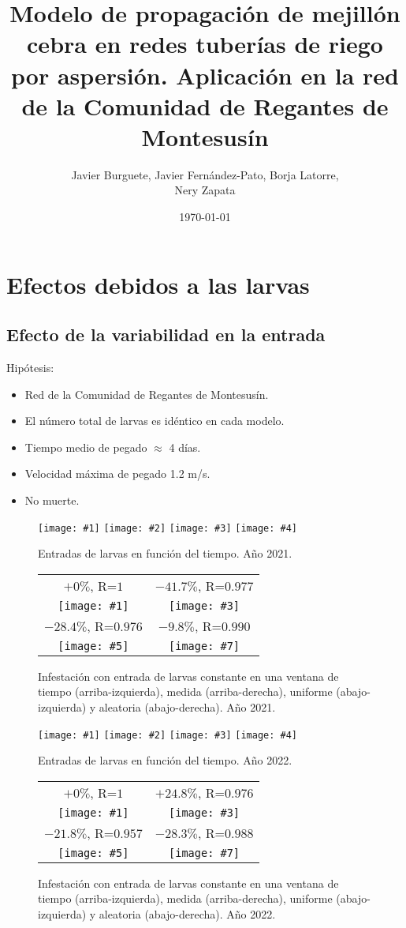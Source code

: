 \documentclass[a4paper]{article}
\author{Javier Burguete, Javier Fernández-Pato, Borja Latorre,\\ Nery Zapata}
\date{\today}
\title{Modelo de propagación de mejillón cebra en redes tuberías de riego por
aspersión. Aplicación en la red de la Comunidad de Regantes de Montesusín}
\newcommand{\FIGIV}[6]
{
	\begin{figure}[ht!]
		\centering
		\texttt{[image: \#1]}
		\texttt{[image: \#2]}
		\texttt{[image: \#3]}
		\texttt{[image: \#4]}
		\caption{#5.\label{#6}}
	\end{figure}
}
\newcommand{\FIGIVB}[9]
{
	\begin{figure}[ht!]
		\centering
		\begin{tabular}{cc}
			#2&#4\\
			\texttt{[image: \#1]}&
			\texttt{[image: \#3]}\\
			#6&#8\\
			\texttt{[image: \#5]}&
			\texttt{[image: \#7]}
		\end{tabular}
		\caption{#9.}
	\end{figure}
}
\begin{document}
\maketitle

\section{Efectos debidos a las larvas}

\subsection{Efecto de la variabilidad en la entrada}

Hipótesis:
\begin{itemize}
\item Red de la Comunidad de Regantes de Montesusín.
\item El número total de larvas es idéntico en cada modelo.
\item Tiempo medio de pegado $\approx$ 4 días.
\item Velocidad máxima de pegado 1.2 m/s.
\item No muerte.
\end{itemize}

\FIGIV{2021-mussel-input-constant.eps}{2021-mussel-input-measured.eps}
{2021-mussel-input-uniform.eps}{2021-mussel-input-random.eps}
{Entradas de larvas en función del tiempo. Año 2021}{Fig2021MusselInput}

\FIGIVB{2021-mussel-constant.pdf}{$+0\%$, R=$1$}
{2021-mussel-measured.pdf}{$-41.7\%$, R=$0.977$}
{2021-mussel-uniform.pdf}{$-28.4\%$, R=$0.976$}
{2021-mussel-random.pdf}{$-9.8\%$, R=$0.990$}
{Infestación con entrada de larvas constante en una ventana de tiempo
(arriba-izquierda), medida (arriba-derecha), uniforme (abajo-izquierda) y
aleatoria (abajo-derecha). Año 2021\label{Fig2021MusselRandom}}

\FIGIV{2022-mussel-input-constant.eps}
{2022-mussel-input-measured.eps}
{2022-mussel-input-uniform.eps}
{2022-mussel-input-random.eps}
{Entradas de larvas en función del tiempo. Año 2022}{Fig2022MusselInput}

\FIGIVB{2022-mussel-constant.pdf}{$+0\%$, R=$1$}
{2022-mussel-measured.pdf}{$+24.8\%$, R=$0.976$}
{2022-mussel-uniform.pdf}{$-21.8\%$, R=$0.957$}
{2022-mussel-random.pdf}{$-28.3\%$, R=$0.988$}
{Infestación con entrada de larvas constante en una ventana de tiempo
(arriba-izquierda), medida (arriba-derecha), uniforme (abajo-izquierda) y
aleatoria (abajo-derecha). Año 2022\label{Fig2022MusselRandom}}
\end{document}
